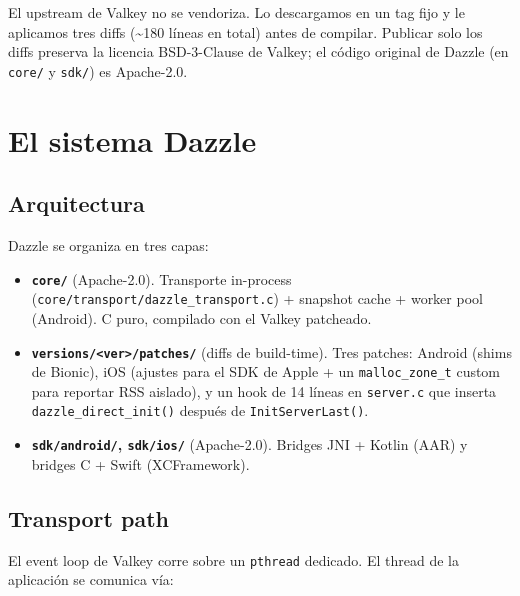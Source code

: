 El upstream de Valkey no se vendoriza. Lo descargamos en un tag fijo y le
aplicamos tres diffs (\textasciitilde180 líneas en total) antes de compilar.
Publicar solo los diffs preserva la licencia BSD-3-Clause de Valkey; el código
original de Dazzle (en \texttt{core/} y \texttt{sdk/}) es Apache-2.0.

\section{El sistema Dazzle}\label{el-sistema-dazzle}

\subsection{Arquitectura}\label{arquitectura}

Dazzle se organiza en tres capas:

\begin{itemize}
\tightlist
\item
  \textbf{\texttt{core/}} (Apache-2.0). Transporte in-process
  (\texttt{core/transport/dazzle\_transport.c}) + snapshot cache + worker pool
  (Android). C puro, compilado con el Valkey patcheado.
\item
  \textbf{\texttt{versions/\textless{}ver\textgreater{}/patches/}} (diffs de
  build-time). Tres patches: Android (shims de Bionic), iOS (ajustes para el SDK
  de Apple + un \texttt{malloc\_zone\_t} custom para reportar RSS aislado), y un
  hook de 14 líneas en \texttt{server.c} que inserta
  \texttt{dazzle\_direct\_init()} después de \texttt{InitServerLast()}.
\item
  \textbf{\texttt{sdk/android/}, \texttt{sdk/ios/}} (Apache-2.0). Bridges JNI +
  Kotlin (AAR) y bridges C + Swift (XCFramework).
\end{itemize}

\subsection{Transport path}\label{transport-path}

El event loop de Valkey corre sobre un \texttt{pthread} dedicado. El thread de
la aplicación se comunica vía:

